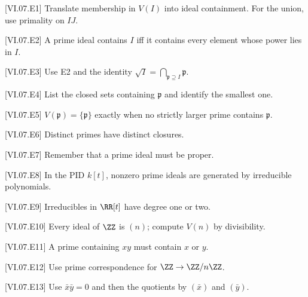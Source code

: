 \begin{hint}
[VI.07.E1]
Translate membership in $V(I)$ into ideal containment.  For the union, use primality on $IJ$.
\end{hint}
\begin{hint}
[VI.07.E2]
A prime ideal contains $I$ iff it contains every element whose power lies in $I$.
\end{hint}
\begin{hint}
[VI.07.E3]
Use E2 and the identity $\sqrt I=\bigcap_{\mathfrak p\supseteq I}\mathfrak p$.
\end{hint}
\begin{hint}
[VI.07.E4]
List the closed sets containing $\mathfrak p$ and identify the smallest one.
\end{hint}
\begin{hint}
[VI.07.E5]
$V(\mathfrak p)=\{\mathfrak p\}$ exactly when no strictly larger prime contains $\mathfrak p$.
\end{hint}
\begin{hint}
[VI.07.E6]
Distinct primes have distinct closures.
\end{hint}
\begin{hint}
[VI.07.E7]
Remember that a prime ideal must be proper.
\end{hint}
\begin{hint}
[VI.07.E8]
In the PID $k[t]$, nonzero prime ideals are generated by irreducible polynomials.
\end{hint}
\begin{hint}
[VI.07.E9]
Irreducibles in $\RR[t]$ have degree one or two.
\end{hint}
\begin{hint}
[VI.07.E10]
Every ideal of $\ZZ$ is $(n)$; compute $V(n)$ by divisibility.
\end{hint}
\begin{hint}
[VI.07.E11]
A prime containing $xy$ must contain $x$ or $y$.
\end{hint}
\begin{hint}
[VI.07.E12]
Use prime correspondence for $\ZZ\to\ZZ/n\ZZ$.
\end{hint}
\begin{hint}
[VI.07.E13]
Use $\bar x\bar y=0$ and then the quotients by $(\bar x)$ and $(\bar y)$.
\end{hint}
